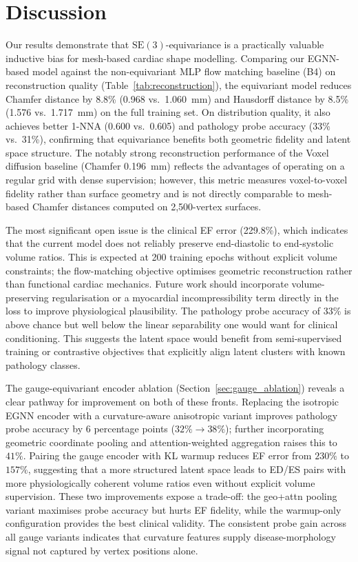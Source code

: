 \documentclass{article}
\newcommand{\SE}{\mathrm{SE}(3)}
\begin{document}
\section{Discussion}
\label{sec:discussion}

Our results demonstrate that $\SE$-equivariance is a practically valuable
inductive bias for mesh-based cardiac shape modelling.
Comparing our EGNN-based model against the non-equivariant MLP flow
matching baseline (B4) on reconstruction quality
(Table~\ref{tab:reconstruction}), the equivariant model reduces Chamfer
distance by 8.8\% (0.968 vs.\ 1.060~mm) and Hausdorff distance by 8.5\%
(1.576 vs.\ 1.717~mm) on the full training set.
On distribution quality, it also achieves better 1-NNA (0.600 vs.\ 0.605)
and pathology probe accuracy (33\% vs.\ 31\%), confirming that equivariance
benefits both geometric fidelity and latent space structure.
The notably strong reconstruction performance of the Voxel diffusion
baseline (Chamfer 0.196~mm) reflects the advantages of operating on a
regular grid with dense supervision; however, this metric measures
voxel-to-voxel fidelity rather than surface geometry and is not directly
comparable to mesh-based Chamfer distances computed on 2{,}500-vertex
surfaces.

The most significant open issue is the clinical EF error (229.8\%),
which indicates that the current model does not reliably preserve
end-diastolic to end-systolic volume ratios.
This is expected at 200 training epochs without explicit volume
constraints; the flow-matching objective optimises geometric reconstruction
rather than functional cardiac mechanics.
Future work should incorporate volume-preserving regularisation or a
myocardial incompressibility term directly in the loss to improve
physiological plausibility.
The pathology probe accuracy of 33\% is above chance but well below
the linear separability one would want for clinical conditioning.
This suggests the latent space would benefit from semi-supervised training
or contrastive objectives that explicitly align latent clusters with
known pathology classes.

The gauge-equivariant encoder ablation (Section~\ref{sec:gauge_ablation})
reveals a clear pathway for improvement on both of these fronts.
Replacing the isotropic EGNN encoder with a curvature-aware anisotropic
variant improves pathology probe accuracy by 6 percentage points
($32\% \to 38\%$); further incorporating geometric coordinate pooling and
attention-weighted aggregation raises this to $41\%$.
Pairing the gauge encoder with KL warmup reduces EF error from $230\%$
to $157\%$, suggesting that a more structured latent space leads to
ED/ES pairs with more physiologically coherent volume ratios even without
explicit volume supervision.
These two improvements expose a trade-off: the geo+attn pooling variant
maximises probe accuracy but hurts EF fidelity, while the warmup-only
configuration provides the best clinical validity.
The consistent probe gain across all gauge variants indicates that
curvature features supply disease-morphology signal not captured by
vertex positions alone.
\end{document}
